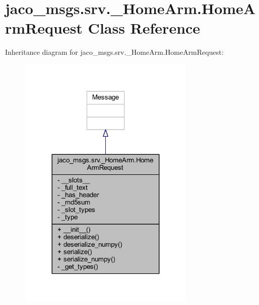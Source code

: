 \hypertarget{classjaco__msgs_1_1srv_1_1__HomeArm_1_1HomeArmRequest}{}\section{jaco\+\_\+msgs.\+srv.\+\_\+\+Home\+Arm.\+Home\+Arm\+Request Class Reference}
\label{classjaco__msgs_1_1srv_1_1__HomeArm_1_1HomeArmRequest}


Inheritance diagram for jaco\+\_\+msgs.\+srv.\+\_\+\+Home\+Arm.\+Home\+Arm\+Request\+:
\nopagebreak
\begin{figure}[H]
\begin{center}
\leavevmode
\includegraphics[width=239pt]{d9/d77/classjaco__msgs_1_1srv_1_1__HomeArm_1_1HomeArmRequest__inherit__graph}
\end{center}
\end{figure}


